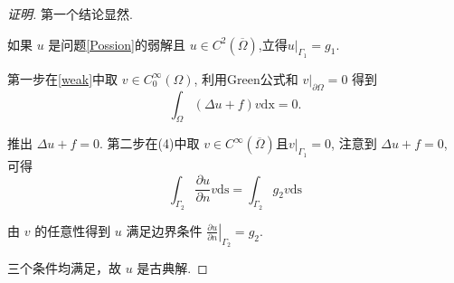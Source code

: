 \documentclass[12pt,a4paper]{article}
\begin{document}
\begin{enumerate}
	\begin{proof}[证明]
		第一个结论显然. 
		
		如果 $u$ 是问题\eqref{Possion}的弱解且 $u \in C^2(\overline{\Omega})$,立得$\left.u\right|_{\Gamma_1}=g_1$.
		
		第一步在\eqref{weak}中取 $v \in C_0^{\infty}(\Omega)$, 利用Green公式和 $\left.v\right|_{\partial \Omega}=0$ 得到
		$$
		\int_{\Omega}(\Delta u+f) v \mathrm{dx}=0 .
		$$
		
		推出 $\Delta u+f=0$. 第二步在(4)中取 $v \in C^{\infty}(\overline{\Omega})$且$\left.v\right|_{\Gamma_1} = 0$, 注意到 $\Delta u+f=0$, 可得
		$$
		\int_{\Gamma_2} \frac{\partial u}{\partial n} v \mathrm{ds}=\int_{\Gamma_2} g_2 v \mathrm{ds}
		$$
		
		由 $v$ 的任意性得到 $u$ 满足边界条件 $\left.\frac{\partial u}{\partial n}\right|_{\Gamma_2}=g_2$.
		
		三个条件均满足，故 $u$ 是古典解.
	\end{proof}
	\end{enumerate}
	
		
	
\end{document}
